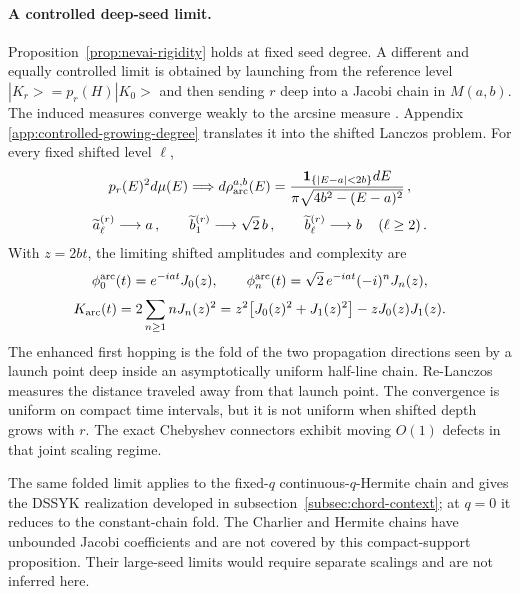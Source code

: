 \documentclass[a4paper,11pt]{article}
\def\ket#1{|#1>}%
\def\dd{d}%
\def\ii{i}%
\def\ee{e}%
\theoremstyle{definition}
\theoremstyle{remark}
\newcommand{\ket}[1]{|#1\rangle}
\newcommand{\dd}{\mathrm d}
\newcommand{\ii}{\mathrm i}
\newcommand{\ee}{\mathrm e}
\begin{document}
\paragraph{A controlled deep-seed limit.}
Proposition~\ref{prop:nevai-rigidity} holds at fixed seed degree.  A different and equally
controlled limit is obtained by launching from the reference level
$\ket{K_r}=p_r(H)\ket{K_0}$ and then sending $r$ deep into a Jacobi chain in $M(a,b)$.  The induced measures converge weakly
to the arcsine measure \cite{VanAssche1995}.  Appendix
\ref{app:controlled-growing-degree} translates it into the shifted Lanczos problem.  For every
fixed shifted level $\ell$,
\begin{equation}
\begin{gathered}
   p_r(E)^2\dd\mu(E)\Longrightarrow
   \dd\rho_{\rm arc}^{a,b}(E)
   =\frac{\boldsymbol 1_{\{|E-a|<2b\}}\dd E}
          {\pi\sqrt{4b^2-(E-a)^2}}\,,\\[2pt]
   \widetilde a_\ell^{(r)}\longrightarrow a\,,\qquad
   \widetilde b_1^{(r)}\longrightarrow\sqrt2\,b\,,\qquad
   \widetilde b_\ell^{(r)}\longrightarrow b\,\quad(\ell\ge2)\,.
\end{gathered}
   \label{eq:deep-seed-folded-bulk-main}
\end{equation}
With $z=2bt$, the limiting shifted amplitudes and complexity are
\begin{equation}
\begin{gathered}
   \phi_0^{\rm arc}(t)=\ee^{-\ii at}J_0(z),\qquad
   \phi_n^{\rm arc}(t)=\sqrt2\,\ee^{-\ii at}(-\ii)^nJ_n(z),\\[2pt]
   \begin{aligned}
   K_{\rm arc}(t)
   =2\sum_{n\ge1}nJ_n(z)^2
   =z^2\bigl[J_0(z)^2+J_1(z)^2\bigr]-zJ_0(z)J_1(z).
   \end{aligned}
\end{gathered}
   \label{eq:deep-seed-folded-dynamics-main}
\end{equation}
The enhanced first hopping is the fold of the two propagation directions seen by a launch point
deep inside an asymptotically uniform half-line chain.  Re-Lanczos measures the distance traveled
away from that launch point.  The convergence is uniform on compact time intervals, but it is not
uniform when shifted depth grows with $r$.  The exact Chebyshev connectors exhibit moving
$O(1)$ defects in that joint scaling regime. 

The same folded limit applies to the fixed-$q$ continuous-$q$-Hermite chain and gives the
DSSYK realization developed in subsection~\ref{subsec:chord-context}; at $q=0$ it reduces to the
constant-chain fold.  The Charlier and Hermite chains have unbounded Jacobi coefficients and are
not covered by this compact-support proposition.  Their large-seed limits would require separate
scalings and are not inferred here.
\end{document}
